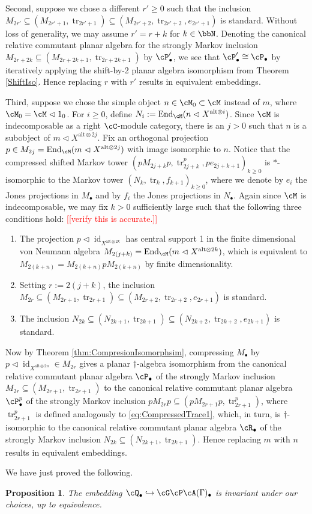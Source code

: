 \documentclass[11pt]{article}
\theoremstyle{plain}
\newtheorem{prop}[thm]{Proposition}
\theoremstyle{definition}
\DeclareMathOperator{\End}{End}
\DeclareMathOperator{\id}{id}
\DeclareMathOperator{\tr}{tr}
\newcommand{\nn}[1]{\textcolor{red}{[[#1]]}}
\begin{document}
Second, suppose we chose a different $r'\geq 0$ such that the inclusion $M_{2r'}\subseteq (M_{2r'+1}, \tr_{2r'+1})\subseteq (M_{2r'+2}, \tr_{2r'+2}, e_{2r'+1})$ is standard.
Without loss of generality, we may assume $r' = r+k$ for $k\in \bbN$.
Denoting the canonical relative commutant planar algebra for the strongly Markov inclusion $M_{2r+2k}\subseteq (M_{2r+2k+1}, \tr_{2r+2k+1})$ by $\cP_\bullet'$, we see that $\cP_\bullet'\cong \cP_\bullet$ by iteratively applying the shift-by-2 planar algebra isomorphism from Theorem \ref{ShiftIso}. 
Hence replacing $r$ with $r'$ results in equivalent embeddings.

Third, suppose we chose the simple object $n\in \cM_0 \subset \cM$ instead of $m$, where $\cM_0 = \cM\vartriangleleft 1_0$.
For $i\geq 0$, define $N_i := \End_\cM(n \vartriangleleft X^{\text{alt}\otimes i})$.
Since $\cM$ is indecomposable as a right $\cC$-module category, there is an $j>0$ such that $n$ is a subobject of $m \vartriangleleft X^{\text{alt}\otimes 2j}$.
Fix an orthogonal projection $p \in M_{2j} = \End_\cM(m \vartriangleleft X^{\text{alt}\otimes 2j})$ with image isomorphic to $n$.
Notice that the compressed shifted Markov tower $(pM_{2j+k}p, \tr_{2j+k}^p, pe_{2j+k+1})_{k\geq 0}$ is $*$-isomorphic to the Markov tower $(N_{k}, \tr_k, f_{k+1})_{k\geq 0}$, where we denote by $e_i$ the Jones projections in $M_\bullet $ and by $f_i$ the Jones projections in $N_\bullet$.
Again since $\cM$ is indecomposable, we may fix $k>0$ sufficiently large such that the following three conditions hold:
\nn{verify this is accurate.}
\begin{enumerate}[label={\rm(\arabic*)}]
\item
The projection $p\vartriangleleft \id_{X^{\text{alt}\otimes 2k}}$ has central support 1 in the finite dimensional von Neumann algebra $M_{2(j+k)} = \End_\cM(m \vartriangleleft X^{\text{alt}\otimes 2k})$, which is equivalent to $M_{2(k+n)} = M_{2(k+n)}p M_{2(k+n)}$ by finite dimensionality.
\item
Setting $r:= 2(j+k)$, the inclusion $M_{2r} \subseteq (M_{2r+1}, \tr_{2r+1}) \subseteq (M_{2r+2}, \tr_{2r+2}, e_{2r+1})$ is standard.
\item
The inclusion $N_{2k} \subseteq (N_{2k+1}, \tr_{2k+1}) \subseteq (N_{2k+2}, \tr_{2k+2}, e_{2k+1})$ is standard.
\end{enumerate}
Now by Theorem \ref{thm:CompresionIsomorphsim}, compressing $M_\bullet$ by $p\vartriangleleft \id_{X^{\text{alt}\otimes 2n}} \in M_{2r}$ gives a planar $\dag$-algebra isomorphism from the canonical relative commutant planar algebra $\cP_\bullet$ of the strongly Markov inclusion $M_{2r} \subseteq (M_{2r+1}, \tr_{2r+1})$ to the 
canonical relative commutant planar algebra $\cP^p_\bullet$ of the strongly Markov inclusion $pM_{2r}p \subseteq (pM_{2r+1}p, \tr^p_{2r+1})$, where $\tr^p_{2r+1}$ is defined analogously to \eqref{eq:CompressedTrace1}, which, in turn, is $\dag$-isomorphic to the canonical relative commutant planar algebra $\cR_\bullet$ of the strongly Markov inclusion $N_{2k} \subseteq (N_{2k+1}, \tr_{2k+1})$.
Hence replacing $m$ with $n$ results in equivalent embeddings. 

We have just proved the following.

\begin{prop}
The embedding $\cQ_\bullet \hookrightarrow \cG\cP\cA(\Gamma)_\bullet$ is invariant under our choices, up to equivalence.
\end{prop}



{\footnotesize{

}}
\end{document}
